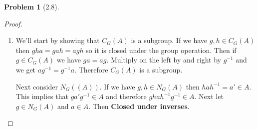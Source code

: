 \documentclass[10pt]{article}
\newcommand{\sk}{\vskip 10mm}
\theoremstyle{plain}
\newtheorem{problem}{Problem}
\theoremstyle{remark}
\begin{document}
\sk

\begin{problem}[2.8]
  
\end{problem}

\begin{proof}
  \begin{enumerate}
  \item We'll start by showing that $C_G(A)$ is a subgroup. If we have $g,h\in C_G(A)$
    then $gha=gah=agh$ so it is closed under the group operation. Then if $g\in C_G(A)$
    we have $ga=ag$. Multiply on the left by and right by $g^{-1}$ and we get
    $ag^{-1}=g^{-1}a$. Therefore $C_G(A)$ is a subgroup.

    Next consider $N_G((A))$. If we have $g,h\in N_G(A)$ then $hah^{-1}=a'\in A$. This
    implies that $ga'g^{-1}\in A$ and therefore $ghah^{-1}g^{-1}\in A$. Next let $g\in N_G(A)$
    and $a\in A$. Then \textbf{Closed under inverses}.


\end{enumerate}
\end{proof}
\end{document}

